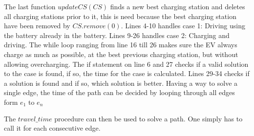 The last function $updateCS(CS)$ finds a new best charging station and deletes all charging stations prior to it, this is need because the best charging station have been removed by $CS.remove(0)$. Lines 4-10 handles case 1: Driving using the battery already in the battery. Lines 9-26 handles case 2: Charging and driving. The while loop ranging from line 16 till 26 makes sure the EV always charge as much as possible, at the best previous charging station, but without allowing overcharging. The if statement on line 6 and 27 checks if a valid solution to the case is found, if so, the time for the case is calculated. Lines 29-34 checks if a solution is found and if so, which solution is better. Having a way to solve a single edge, the time of the path can be decided by looping through all edges form $e_1$ to $e_n$

The $travel\_time$ procedure can then be used to solve a path. One simply has to call it for each consecutive edge.


